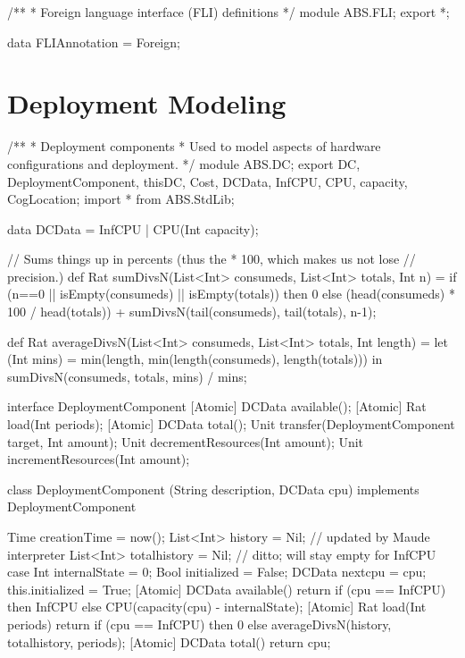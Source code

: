 \begin{abscode}
/**
 * Foreign language interface (FLI) definitions
 */
module ABS.FLI;
export *;

data FLIAnnotation = Foreign;
\end{abscode}

\section{Deployment Modeling}

\begin{abscode}
/** 
 * Deployment components
 * Used to model aspects of hardware configurations and deployment.
 */
module ABS.DC;
export DC, DeploymentComponent, thisDC, Cost, DCData, InfCPU, CPU, capacity, CogLocation;
import * from ABS.StdLib;

data DCData = InfCPU
            | CPU(Int capacity);

// Sums things up in percents (thus the * 100, which makes us not lose
// precision.)
def Rat sumDivsN(List<Int> consumeds, List<Int> totals, Int n) =
  if (n==0 || isEmpty(consumeds) || isEmpty(totals))
  then 0
  else (head(consumeds) * 100 / head(totals)) + sumDivsN(tail(consumeds), tail(totals), n-1);

def Rat averageDivsN(List<Int> consumeds, List<Int> totals, Int length) =
  let (Int mins) = min(length, min(length(consumeds), length(totals)))
  in sumDivsN(consumeds, totals, mins) / mins;

interface DeploymentComponent {
    [Atomic] DCData available();
    [Atomic] Rat load(Int periods);
    [Atomic] DCData total();
    Unit transfer(DeploymentComponent target, Int amount);
    Unit decrementResources(Int amount);
    Unit incrementResources(Int amount);
}

class DeploymentComponent (String description, DCData cpu)
implements DeploymentComponent {
    Time creationTime = now();
    List<Int> history = Nil;      // updated by Maude interpreter
    List<Int> totalhistory = Nil; // ditto; will stay empty for InfCPU case
    Int internalState = 0;
    Bool initialized = False;
    DCData nextcpu = cpu;
    {
        this.initialized = True;
    }
    [Atomic] DCData available() {
        return if (cpu == InfCPU) then InfCPU else CPU(capacity(cpu) - internalState);
    }
    [Atomic] Rat load(Int periods) {
        return if (cpu == InfCPU) then 0
        else averageDivsN(history, totalhistory, periods);
    }
    [Atomic] DCData total() {
        return cpu;
    }

}
\end{abscode}
